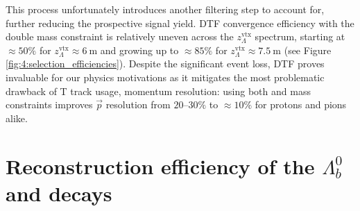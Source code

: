 

This process unfortunately introduces another filtering step to account for, further reducing the prospective signal yield.
DTF convergence efficiency with the double mass constraint is relatively uneven across the $z_\Lambda^\text{vtx}$ spectrum, starting at $\approx 50\%$ for $z_\Lambda^\text{vtx} \approx \SI{6}{\meter}$ and growing up to $\approx 85\%$ for $z_\Lambda^\text{vtx} \approx \SI{7.5}{\meter}$ (see Figure \ref{fig:4:selection_efficiencies}).
Despite the significant event loss, DTF proves invaluable for our physics motivations as it mitigates the most problematic drawback of T track usage, momentum resolution:
using both \jpsi and \lz mass constraints improves $\vec{p}$ resolution from $20$--$30\%$ to $\approx 10\%$ for protons and pions alike.



\section{Reconstruction efficiency of the \texorpdfstring{$\Lambda^0_b$}{Lambdab} and \texorpdfstring{\lz}{Lambda} decays}
\label{sec:reco_efficiency}

